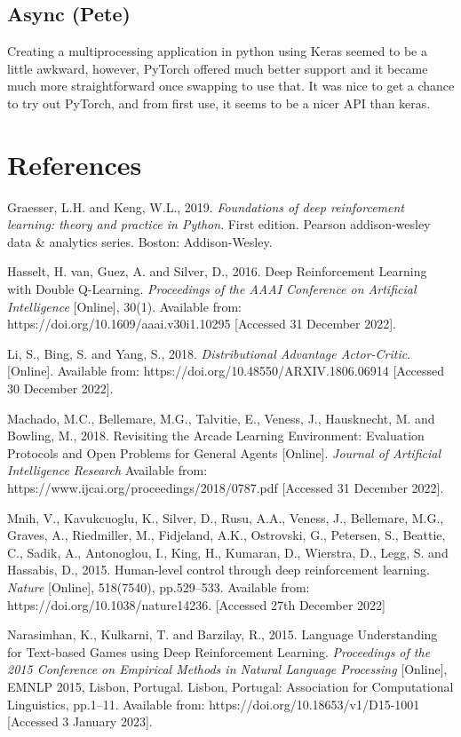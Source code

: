 \documentclass{article}
\begin{document}
\subsection{Async (Pete)}

Creating a multiprocessing application in python using Keras seemed to be a little awkward, however, PyTorch offered much better support and it became much more straightforward once swapping to use that. It was nice to get a chance to try out PyTorch, and from first use, it seems to be a nicer API than keras.

\section*{References}

\small 

Graesser, L.H. and Keng, W.L., 2019. \emph{Foundations of deep reinforcement learning: theory and practice in Python}. First edition. Pearson addison-wesley data \& analytics series. Boston: Addison-Wesley.

Hasselt, H. van, Guez, A. and Silver, D., 2016. Deep Reinforcement Learning with Double Q-Learning. \emph{Proceedings of the AAAI Conference on Artificial Intelligence} [Online], 30(1). Available from: https://doi.org/10.1609/aaai.v30i1.10295 [Accessed 31 December 2022].

Li, S., Bing, S. and Yang, S., 2018. \emph{Distributional Advantage Actor-Critic}. [Online]. Available from: https://doi.org/10.48550/ARXIV.1806.06914 [Accessed 30 December 2022].

Machado, M.C., Bellemare, M.G., Talvitie, E., Veness, J., Hausknecht, M. and Bowling, M., 2018. Revisiting the Arcade Learning Environment: Evaluation Protocols and Open Problems for General Agents [Online]. \emph{Journal of Artificial Intelligence Research}  Available from: https://www.ijcai.org/proceedings/2018/0787.pdf  [Accessed 31 December 2022].

Mnih, V., Kavukcuoglu, K., Silver, D., Rusu, A.A., Veness, J., Bellemare, M.G., Graves, A., Riedmiller, M., Fidjeland, A.K., Ostrovski, G., Petersen, S., Beattie, C., Sadik, A., Antonoglou, I., King, H., Kumaran, D., Wierstra, D., Legg, S. and Hassabis, D., 2015. Human-level control through deep reinforcement learning. \emph{Nature} [Online], 518(7540), pp.529–533. Available from: https://doi.org/10.1038/nature14236. [Accessed 27th December 2022]

Narasimhan, K., Kulkarni, T. and Barzilay, R., 2015. Language Understanding for Text-based Games using Deep Reinforcement Learning. \emph{Proceedings of the 2015 Conference on Empirical Methods in Natural Language Processing} [Online], EMNLP 2015, Lisbon, Portugal. Lisbon, Portugal: Association for Computational Linguistics, pp.1–11. Available from: https://doi.org/10.18653/v1/D15-1001 [Accessed 3 January 2023].
\end{document}
